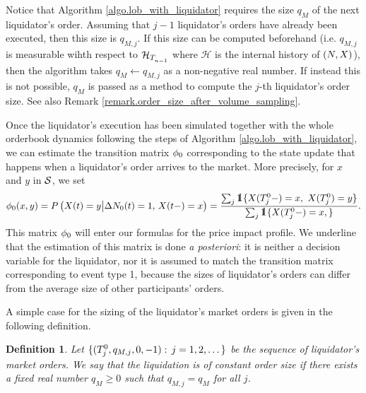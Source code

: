 \documentclass[10pt]{article}
\newtheorem{defi}[thm]{Definition}
\begin{document}
\begin{remark}
 Notice that Algorithm \ref{algo.lob_with_liquidator} requires the size $q_M$ of the next liquidator's order. Assuming that $j-1$ liquidator's orders have already been executed, then this size is $q_{M,j}$. If this size can be computed beforehand (i.e. $q_{M,j}$ is measurable wihth respect to $\mathcal{H}_{\arrivalTimes[]_{n-1}}$ where $\mathcal{H}$ is the internal history of $(\multiCountingProc,\stateVariable)$), then the algorithm takes  $q_M \leftarrow q_{M,j}$ as a non-negative real number. If instead this is not possible, $q_M$ is passed as a method to compute the $j$-th liquidator's order size. See also Remark \ref{remark.order_size_after_volume_sampling}. 
\end{remark}

Once the liquidator's execution has been simulated together with the whole orderbook dynamics following the steps of Algorithm \ref{algo.lob_with_liquidator}, we can estimate the transition matrix $\transProb_{0}$ corresponding to the  state update that happens when a liquidator's order arrives to the market. More precisely, for $x$ and $y$ in $\stateSpace$, we set 
\begin{equation}\label{eq.transProb_liquidator}
  \transProb_{0}(x,y) = \Prob\left(\stateVariable(t) = y \big\vert \Delta\countingProc[0](t)=1, \, \stateVariable(t-)=x\right) = \frac{\sum_j \one\lbrace\stateVariable(\arrivalTimes[0]_j - )=x, \, \, \stateVariable(\arrivalTimes[0]_j )=y\rbrace} {\sum_j \one\lbrace\stateVariable(\arrivalTimes[0]_j - )=x, \rbrace}.
\end{equation}
This matrix $\transProb_0$ will enter our formulas for the price impact profile. We underline that the estimation of this matrix is done \emph{a posteriori}: it is neither a decision variable for the liquidator, nor it is assumed to match the transition matrix corresponding to event type 1, because the sizes of liquidator's orders can differ from the average size of other participants' orders. 

A simple case for the sizing of the liquidator's market orders is given in the following definition. 
\begin{defi}\label{def.liquidation_with_constant_size}
 Let $\lbrace (\arrivalTimes[0]_j, q_{M,j}, 0, -1): \, j=1,2,\dots\rbrace$ be the sequence of liquidator's market orders. We say that the liquidation is of constant order size if there exists a fixed real number $q_{M}\geq 0$ such that $q_{M,j} = q_{M}$ for all $j$.
\end{defi}
\end{document}
